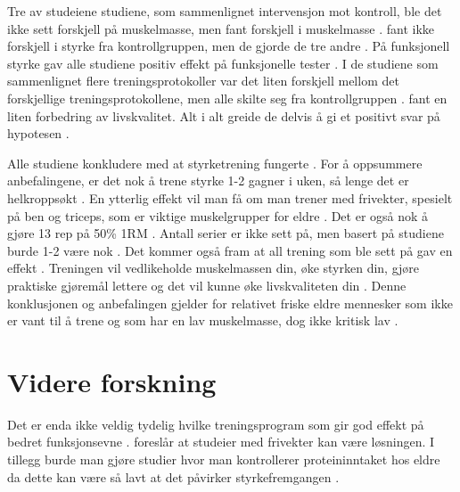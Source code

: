 \documentclass[
]{book}
\begin{document}
Tre av studeiene studiene, som sammenlignet intervensjon mot kontroll, ble det ikke sett forskjell på muskelmasse, men \citet{vikberg2019} fant forskjell i muskelmasse \citep{schott2019, turpela2017, vincent2002}. \citet{vikberg2019} fant ikke forskjell i styrke fra kontrollgruppen, men de gjorde de tre andre \citep{schott2019, turpela2017, vincent2002}. På funksjonell styrke gav alle studiene positiv effekt på funksjonelle tester \citep{geirsdottir2012, schott2019, turpela2017, vikberg2019, vincent2002}. I de studiene som sammenlignet flere treningsprotokoller var det liten forskjell mellom det forskjellige treningsprotokollene, men alle skilte seg fra kontrollgruppen \citep{schott2019, turpela2017, vikberg2019, vincent2002}. \citet{geirsdottir2012} fant en liten forbedring av livskvalitet. Alt i alt greide de delvis å gi et positivt svar på hypotesen \citep{geirsdottir2012, schott2019, turpela2017, vikberg2019, vincent2002}.

Alle studiene konkludere med at styrketrening fungerte \citep{geirsdottir2012, schott2019, turpela2017, vikberg2019, vincent2002}. For å oppsummere anbefalingene, er det nok å trene styrke 1-2 gagner i uken, så lenge det er helkroppsøkt \citep{turpela2017, vikberg2019}. En ytterlig effekt vil man få om man trener med frivekter, spesielt på ben og triceps, som er viktige muskelgrupper for eldre \citep{schott2019}. Det er også nok å gjøre 13 rep på 50\% 1RM \citep{vincent2002}. Antall serier er ikke sett på, men basert på studiene burde 1-2 være nok \citep{geirsdottir2012, schott2019, turpela2017}. Det kommer også fram at all trening som ble sett på gav en effekt \citep{geirsdottir2012, schott2019, turpela2017, vikberg2019, vincent2002}. Treningen vil vedlikeholde muskelmassen din, øke styrken din, gjøre praktiske gjøremål lettere og det vil kunne øke livskvaliteten din \citep{geirsdottir2012, schott2019, turpela2017, vikberg2019, vincent2002}. Denne konklusjonen og anbefalingen gjelder for relativet friske eldre mennesker som ikke er vant til å trene og som har en lav muskelmasse, dog ikke kritisk lav \citep{geirsdottir2012, schott2019, turpela2017, vikberg2019, vincent2002}.

\hypertarget{videre-forskning}{%
\section{Videre forskning}\label{videre-forskning}}

Det er enda ikke veldig tydelig hvilke treningsprogram som gir god effekt på bedret funksjonsevne \citep{turpela2017}. \citet{schott2019} foreslår at studeier med frivekter kan være løsningen. I tillegg burde man gjøre studier hvor man kontrollerer proteininntaket hos eldre da dette kan være så lavt at det påvirker styrkefremgangen \citep{turpela2017}.
\end{document}
